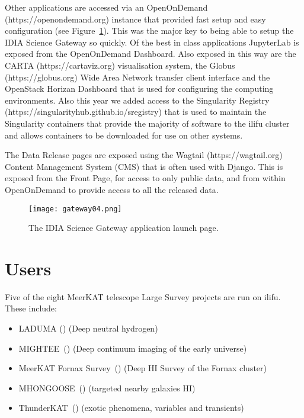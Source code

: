 \documentclass{iau_FM}
\begin{document}
Other applications are accessed via an OpenOnDemand (https://openondemand.org) instance that provided fast
setup and easy configuration (see Figure~\ref{fig:gateway-launch-page}). 
This was the major key to being able to setup the IDIA Science 
Gateway so quickly.
Of the best in class applications JupyterLab is exposed from the OpenOnDemand Dashboard. Also exposed in this
way are the CARTA (https://cartaviz.org) visualisation system, the Globus (https://globus.org)
Wide Area Network transfer client interface and the OpenStack Horizan
Dashboard that is used for configuring the computing environments. Also this year we added access
to the Singularity Registry (https://singularityhub.github.io/sregistry)
 that is used to maintain the Singularity 
containers that provide the majority of software to the {\sc ilifu} cluster and allows containers to be downloaded
for use on other systems.

The Data Release pages are exposed using the Wagtail (https://wagtail.org) Content Management System (CMS)
that is often used with Django. This is exposed from the Front Page, for access to only public data,
and from within OpenOnDemand to provide access to all the released data.




\begin{figure}
    \centering
    \texttt{[image: gateway04.png]}
    \label{fig:gateway-launch-page}
\caption{The IDIA Science Gateway application launch page.}
\end{figure}
    






\section{Users}
\label{sec:users}

Five of the eight MeerKAT telescope Large Survey projects are run on ilifu. 
These include:
\begin{itemize}
\item LADUMA (\cite{laduma}) (Deep neutral hydrogen)
\item MIGHTEE~(\cite{mightee}) (Deep continuum imaging of the early universe)
\item MeerKAT Fornax Survey~(\cite{formax}) (Deep HI Survey of the Fornax cluster)
\item MHONGOOSE~(\cite{mongoose}) (targeted nearby galaxies HI)
\item ThunderKAT~(\cite{thunderkat}) (exotic phenomena, variables and transients)
\end{itemize}
\end{document}
